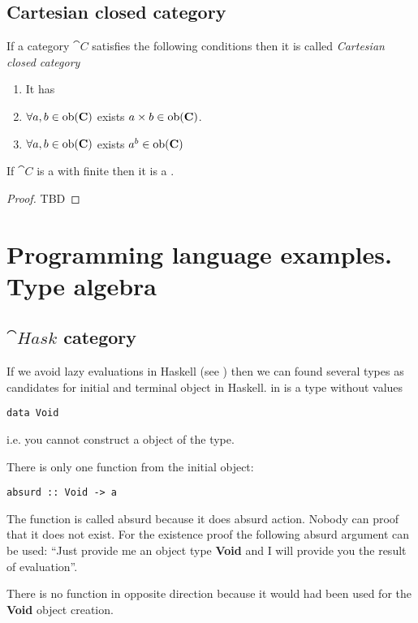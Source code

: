 \subsection{Cartesian closed category}
\begin{definition}
\label{def:cartesian_closed_category}
If a category $\cat{C}$ satisfies the following conditions then it is
called \textit{Cartesian closed category}
\begin{enumerate}
\item It has 
\item $\forall a,b \in \mathrm{ob}(\mathbf{C})$ exists  $a
  \times b \in \mathrm{ob}(\mathbf{C})$.
\item $\forall a,b \in \mathrm{ob}(\mathbf{C})$ exists 
  $a^b \in \mathrm{ob}(\mathbf{C})$
\end{enumerate}
\end{definition}

\begin{theorem}
\label{thm:ccc}
If $\cat{C}$ is a  with
finite  then it is a
.
\begin{proof}
TBD
\end{proof}
\end{theorem}

\section{Programming language examples. Type algebra}

\subsection{$\cat{Hask}$ category}
\begin{example}
If we avoid lazy evaluations in Haskell (see
) then we can found several types
as candidates for initial and terminal object in Haskell. 
\label{ex:hask_initial_object}
 in  is a
type without values 
\begin{verbatim}
data Void
\end{verbatim}
i.e. you cannot construct a object of the type.

There is only one function from the initial object:
\begin{verbatim}
absurd :: Void -> a
\end{verbatim}
The function is called absurd because it does absurd action. Nobody
can proof that it does not exist. For the existence proof the
following absurd argument can be used: ``Just provide me an object type
\textbf{Void} and I will provide you the result of
evaluation''.  

There is no function in opposite direction because it would had been
used for the \textbf{Void} object creation. 
\end{example}

